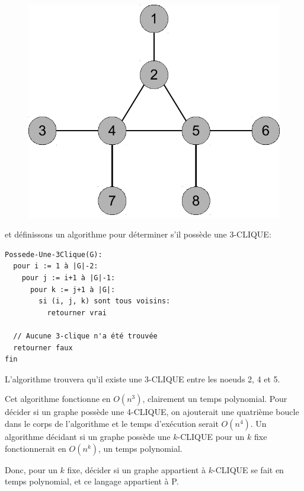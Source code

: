 \documentclass[10pt]{article}
\begin{document}
\begin{figure}[h]
  \centering
  \includegraphics[scale=0.4]{graphe3}
\end{figure}

et définissons un algorithme pour déterminer s'il possède une
3-CLIQUE:

\begin{verbatim}
Possede-Une-3Clique(G):
  pour i := 1 à |G|-2:
    pour j := i+1 à |G|-1:
      pour k := j+1 à |G|:
        si (i, j, k) sont tous voisins:
          retourner vrai

  // Aucune 3-clique n'a été trouvée
  retourner faux
fin
\end{verbatim}

L'algorithme trouvera qu'il existe une 3-CLIQUE entre les noeuds 2, 4
et 5.

Cet algorithme fonctionne en $O(n^3)$, clairement un temps polynomial.
Pour décider si un graphe possède une 4-CLIQUE, on ajouterait une
quatrième boucle dans le corps de l'algorithme et le temps d'exécution
serait $O(n^4)$.  Un algorithme décidant si un graphe possède une
$k$-CLIQUE pour un $k$ fixe fonctionnerait en $O(n^k)$, un temps
polynomial.

Donc, pour un $k$ fixe, décider si un graphe appartient à $k$-CLIQUE
se fait en temps polynomial, et ce langage appartient à P.
\end{document}
